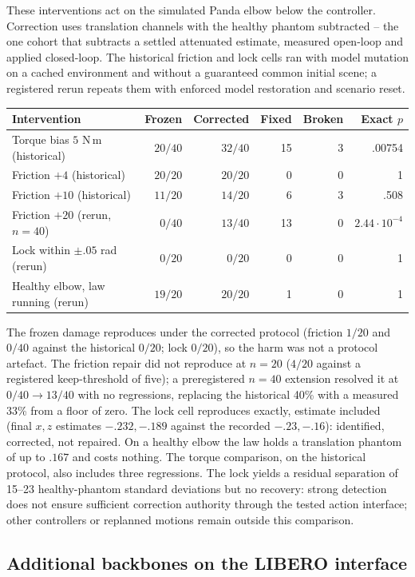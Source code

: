 These interventions act on the simulated Panda elbow below the controller.
Correction uses translation channels with the healthy phantom subtracted --
the one cohort that subtracts a settled attenuated estimate, measured
open-loop and applied closed-loop. The historical friction and lock cells
ran with model mutation on a cached environment and without a guaranteed
common initial scene; a registered rerun repeats them with enforced model
restoration and scenario reset.
\begin{center}\small
\begin{tabular}{lrrrrr}
\toprule
Intervention & Frozen & Corrected & Fixed & Broken & Exact $p$\\
\midrule
Torque bias $5$ N\,m (historical) & $20/40$ & $32/40$ & 15 & 3 & .00754\\
Friction $+4$ (historical) & $20/20$ & $20/20$ & 0 & 0 & 1\\
Friction $+10$ (historical) & $11/20$ & $14/20$ & 6 & 3 & .508\\
Friction $+20$ (rerun, $n{=}40$) & $0/40$ & $13/40$ & 13 & 0 & $2.44\cdot10^{-4}$\\
Lock within $\pm.05$ rad (rerun) & $0/20$ & $0/20$ & 0 & 0 & 1\\
Healthy elbow, law running (rerun) & $19/20$ & $20/20$ & 1 & 0 & 1\\
\bottomrule
\end{tabular}
\end{center}
The frozen damage reproduces under the corrected protocol (friction $1/20$
and $0/40$ against the historical $0/20$; lock $0/20$), so the harm was not
a protocol artefact. The friction repair did not reproduce at $n{=}20$
($4/20$ against a registered keep-threshold of five); a preregistered
$n{=}40$ extension resolved it at $0/40\to13/40$ with no regressions,
replacing the historical 40\% with a measured 33\% from a floor of zero.
The lock cell reproduces exactly, estimate included (final $x,z$ estimates
$-.232,-.189$ against the recorded $-.23,-.16$): identified, corrected, not
repaired. On a healthy elbow the law holds a translation phantom of up to
$.167$ and costs nothing. The torque comparison, on the historical protocol,
also includes three regressions. The lock yields a residual separation of
15--23 healthy-phantom standard deviations but no recovery: strong detection
does not ensure sufficient correction authority through the tested action
interface; other controllers or replanned motions remain outside this
comparison.

\subsection{Additional backbones on the LIBERO interface}
\label{app:transferdetails}

